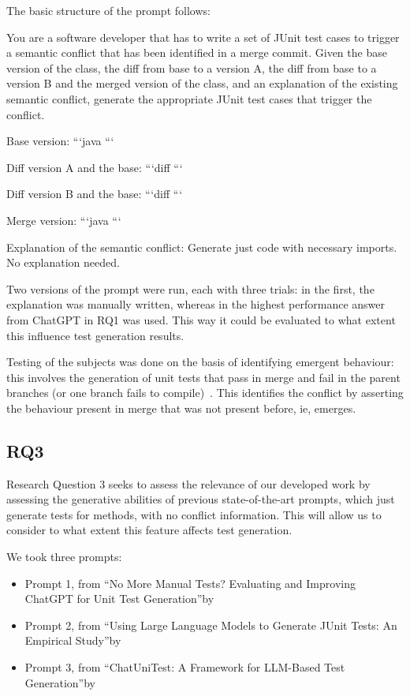 The basic structure of the prompt follows:
\begin{prompt}
You are a software developer that has to write a set of JUnit test cases to trigger a semantic conflict that has been identified in a merge commit. 
Given the base version of the class, the diff from base to a version A, the diff from base to a version B and the merged version of the class, and an explanation of the existing semantic conflict, generate the appropriate JUnit test cases that trigger the conflict.

Base version:
```java
```

Diff version A and the base:
```diff
```

Diff version B and the base:
```diff
```

Merge version:
```java
```

Explanation of the semantic conflict:
Generate just code with necessary imports. No explanation needed.  
\end{prompt}
Two versions of the prompt were run, each with three trials: in the first, the explanation was manually written, whereas in the highest performance answer from ChatGPT in RQ1 was used.
This way it could be evaluated to what extent this influence test generation results.

Testing of the subjects was done on the basis of identifying emergent behaviour: this involves the generation of unit tests that 
pass in merge and fail in the parent branches (or one branch fails to compile)~\citep{kn:nuno}. This identifies the conflict by
asserting the behaviour present in merge that was not present before, ie, emerges.

\subsection{RQ3}

Research Question 3 seeks to assess the relevance of our developed work by assessing the generative abilities of previous state-of-the-art prompts,
which just generate tests for methods, with no conflict information. This will allow us to consider to what extent this feature affects test generation.

We took three prompts:
\begin{itemize}
  \item Prompt 1, from ``No More Manual Tests? Evaluating and Improving ChatGPT for Unit Test Generation''by ~\citet{kn:chattester}
  \item Prompt 2, from ``Using Large Language Models to Generate JUnit Tests: An Empirical Study''by ~\citet{kn:siddiq2023empirical}
  \item Prompt 3, from ``ChatUniTest: A Framework for LLM-Based Test Generation''by~\citet{kn:chatunitest}
\end{itemize}

